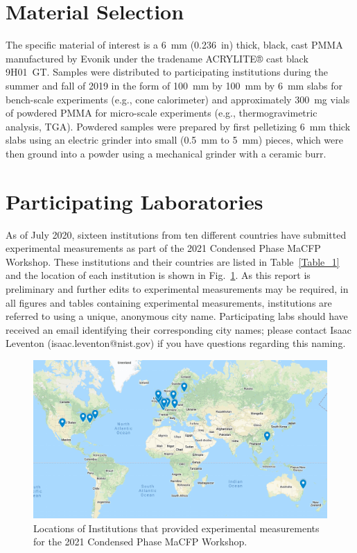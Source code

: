 \documentclass{book}
\begin{document}
\section{Material Selection}

The specific material of interest is a 6~mm (0.236~in) thick, black, cast PMMA manufactured by Evonik under the tradename ACRYLITE® cast black 9H01~GT. Samples were distributed to participating institutions during the summer and fall of 2019 in the form of 100~mm by 100~mm by 6~mm slabs for bench-scale experiments (e.g., cone calorimeter) and approximately 300~mg vials of powdered PMMA for micro-scale experiments (e.g., thermogravimetric analysis, TGA). Powdered samples were prepared by first pelletizing 6~mm thick slabs using an electric grinder into small (0.5~mm to 5~mm) pieces, which were then ground into a powder using a mechanical grinder with a ceramic burr.

\section{Participating Laboratories}

As of July 2020, sixteen institutions from ten different countries have submitted experimental measurements as part of the 2021 Condensed Phase MaCFP Workshop. These institutions and their countries are listed in Table~\ref{Table_1} and the location of each institution is shown in Fig.~\ref{Fig:MaCFP_Map_20200831}. As this report is preliminary and further edits to experimental measurements may be required, in all figures and tables containing experimental measurements, institutions are referred to using a unique, anonymous city name. Participating labs should have received an email identifying their corresponding city names; please contact Isaac Leventon (isaac.leventon@nist.gov) if you have questions regarding this naming.

\begin{figure}
  \centering
  \includegraphics[width=6in]{FIGURES/MaCFP_Map}
  \caption{Locations of Institutions that provided experimental measurements for the 2021 Condensed Phase MaCFP Workshop.}
  \label{Fig:MaCFP_Map_20200831}
\end{figure}
\end{document}
